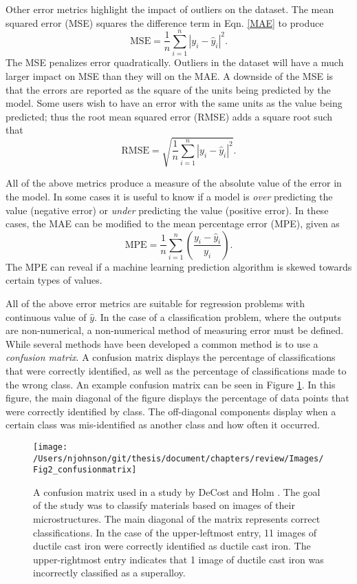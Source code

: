 Other error metrics highlight the impact of outliers on the dataset. The mean squared error (MSE) squares the difference term in Eqn. \ref{MAE} to produce
\begin{equation}
	\text{MSE} = \frac{1}{n} \sum_{i=1}^n |y_i - \hat y_i|^2.
	\label{MSE}
\end{equation}
The MSE penalizes error quadratically. Outliers in the dataset will have a much larger impact on MSE than they will on the MAE. A downside of the MSE is that the errors are reported as the square of the units being predicted by the model. Some users wish to have an error with the same units as the value being predicted; thus the root mean squared error (RMSE) adds a square root such that
\begin{equation}
	\text{RMSE} = \sqrt{\frac{1}{n} \sum_{i=1}^n |y_i - \hat y_i|^2}.
	\label{RMSE}
\end{equation}

All of the above metrics produce a measure of the absolute value of the error in the model. In some cases it is useful to know if a model is \textit{over} predicting the value (negative error) or \textit{under} predicting the value (positive error). In these cases, the MAE can be modified to the mean percentage error (MPE), given as
\begin{equation}
	\text{MPE} = \frac{1}{n} \sum_{i=1}^n \left( \frac{y_i - \hat y_i}{y_i}\right).
	\label{MPE}
\end{equation}
The MPE can reveal if a machine learning prediction algorithm is skewed towards certain types of values.

All of the above error metrics are suitable for regression problems with continuous value of $\hat y$. In the case of a classification problem, where the outputs are non-numerical, a non-numerical method of measuring error must be defined. While several methods have been developed \cite{Metrics2018, Metrics2019} a common method is to use a \textit{confusion matrix}. A confusion matrix displays the percentage of classifications that were correctly identified, as well as the percentage of classifications made to the wrong class. An example confusion matrix can be seen in Figure \ref{confusionmatrix}. In this figure, the main diagonal of the figure displays the percentage of data points that were correctly identified by class. The off-diagonal components display when a certain class was mis-identified as another class and how often it occurred.

\begin{figure}
	\texttt{[image: /Users/njohnson/git/thesis/document/chapters/review/Images/Fig2\_confusionmatrix]}
	\caption{A confusion matrix used in a study by DeCost and Holm \cite{DeCost2015}. The goal of the study was to classify materials based on images of their microstructures. The main diagonal of the matrix represents correct classifications. In the case of the upper-leftmost entry, 11 images of ductile cast iron were correctly identified as ductile cast iron. The upper-rightmost entry indicates that 1 image of ductile cast iron was incorrectly classified as a superalloy.}
	\label{confusionmatrix}
\end{figure}

